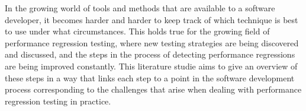 In the growing world of tools and methods that are available to a software developer, it becomes harder and harder to keep track of which technique is best to use under what circumstances. This holds true for the growing field of performance regression testing, where new testing strategies are being discovered and discussed, and the steps in the process of detecting performance regressions are being improved constantly. This literature studie aims to give an overview of these steps in a way that links each step to a point in the software development process corresponding to the challenges that arise when dealing with performance regression testing in practice.
